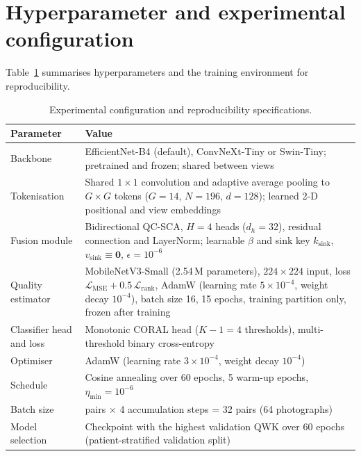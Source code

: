 \documentclass[final,5p,times,twocolumn,authoryear]{elsarticle}
\theoremstyle{plain}
\theoremstyle{remark}
\begin{document}
\section{Hyperparameter and experimental configuration}
\label{app:config}

Table~\ref{tab:s7_config} summarises hyperparameters and the training environment for reproducibility.

\begin{table}[!tb]
\centering
\caption{Experimental configuration and reproducibility specifications.}
\label{tab:s7_config}
\footnotesize
\begin{tabular}{@{}>{\raggedright\arraybackslash}p{}>{\raggedright\arraybackslash}p{}@{}}
\toprule
Parameter & Value \\
\midrule
Backbone & EfficientNet-B4 (default), ConvNeXt-Tiny or Swin-Tiny; pretrained and frozen; shared between views \\
Tokenisation & Shared $1\times1$ convolution and adaptive average pooling to $G\times G$ tokens ($G=14$, $N=196$, $d=128$); learned 2-D positional and view embeddings \\
Fusion module & Bidirectional QC-SCA, $H=4$ heads ($d_h=32$), residual connection and LayerNorm; learnable $\beta$ and sink key $k_{\text{sink}}$, $v_{\text{sink}}\equiv\mathbf{0}$, $\epsilon=10^{-6}$ \\
Quality estimator & MobileNetV3-Small (2.54\,M parameters), $224\times224$ input, loss $\mathcal{L}_{\text{MSE}}+0.5\,\mathcal{L}_{\text{rank}}$, AdamW (learning rate $5\times10^{-4}$, weight decay $10^{-4}$), batch size 16, 15 epochs, training partition only, frozen after training \\
Classifier head and loss & Monotonic CORAL head ($K-1=4$ thresholds), multi-threshold binary cross-entropy \\
Optimiser & AdamW (learning rate $3\times10^{-4}$, weight decay $10^{-4}$) \\
Schedule & Cosine annealing over 60 epochs, 5 warm-up epochs, $\eta_{\min}=10^{-6}$ \\
Batch size & 8 pairs $\times$ 4 accumulation steps = 32 pairs (64 photographs) \\
Model selection & Checkpoint with the highest validation QWK over 60 epochs (patient-stratified validation split) \\

\end{tabular}
\end{table}
\end{document}
